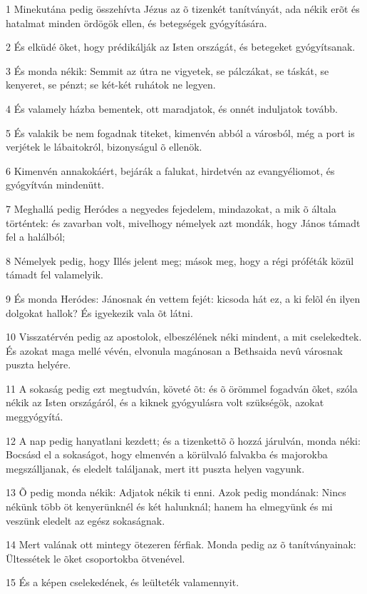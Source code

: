 \par 1 Minekutána pedig összehívta Jézus az õ tizenkét tanítványát, ada nékik erõt és hatalmat minden ördögök ellen, és betegségek gyógyítására.
\par 2 És elküdé õket, hogy prédikálják az Isten országát, és betegeket gyógyítsanak.
\par 3 És monda nékik: Semmit az útra ne vigyetek, se pálczákat, se táskát, se kenyeret, se pénzt; se két-két ruhátok ne legyen.
\par 4 És valamely házba bementek, ott maradjatok, és onnét induljatok tovább.
\par 5 És valakik be nem fogadnak titeket, kimenvén abból a városból, még a port is verjétek le lábaitokról, bizonyságul õ ellenök.
\par 6 Kimenvén annakokáért, bejárák a falukat, hirdetvén az evangyéliomot, és gyógyítván mindenütt.
\par 7 Meghallá pedig Heródes a negyedes fejedelem, mindazokat, a mik õ általa történtek: és zavarban volt, mivelhogy némelyek azt mondák, hogy János támadt fel a halálból;
\par 8 Némelyek pedig, hogy Illés jelent meg; mások meg, hogy a régi próféták közül támadt fel valamelyik.
\par 9 És monda Heródes: Jánosnak én vettem fejét: kicsoda hát ez, a ki felõl én ilyen dolgokat hallok? És igyekezik vala õt látni.
\par 10 Visszatérvén pedig az apostolok, elbeszélének néki mindent, a mit cselekedtek. És azokat maga mellé vévén, elvonula magánosan a Bethsaida nevû városnak puszta helyére.
\par 11 A sokaság pedig ezt megtudván, követé õt: és õ örömmel fogadván õket, szóla nékik az Isten országáról, és a kiknek gyógyulásra volt szükségök, azokat meggyógyítá.
\par 12 A nap pedig hanyatlani kezdett; és a tizenkettõ õ hozzá járulván, monda néki: Bocsásd el a sokaságot, hogy elmenvén a körülvaló falvakba és majorokba megszálljanak, és eledelt találjanak, mert itt puszta helyen vagyunk.
\par 13 Õ pedig monda nékik: Adjatok nékik ti enni. Azok pedig mondának: Nincs nékünk több öt kenyerünknél és két halunknál; hanem ha elmegyünk és mi veszünk eledelt az egész sokaságnak.
\par 14 Mert valának ott mintegy ötezeren férfiak. Monda pedig az õ tanítványainak: Ültessétek le õket csoportokba ötvenével.
\par 15 És a képen cselekedének, és leülteték valamennyit.
